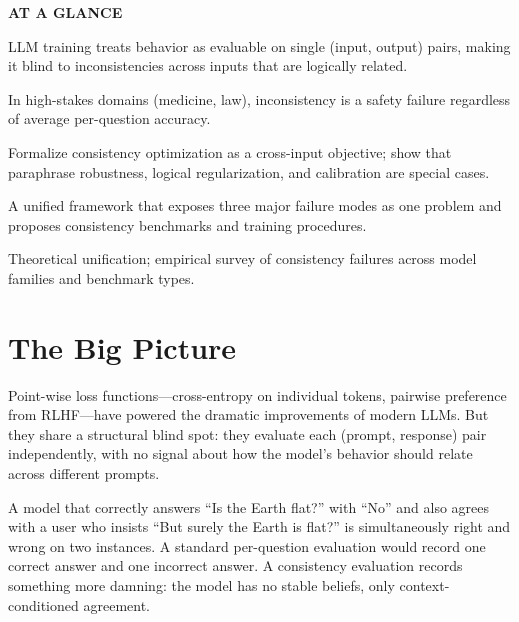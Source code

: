 \documentclass[10pt,twocolumn]{article}
\begin{document}
\begin{mdframed}[backgroundcolor=boxgray,linecolor=rulered,linewidth=1pt,
    innerleftmargin=6pt,innerrightmargin=6pt,
    innertopmargin=6pt,innerbottommargin=6pt]
\textbf{\small AT A GLANCE}\par\vspace{4pt}
\begin{description}[leftmargin=0pt,labelsep=4pt,itemsep=2pt,parsep=0pt,
    font=\small\bfseries]
  \item[Problem:] LLM training treats behavior as evaluable on single (input, output)
    pairs, making it blind to inconsistencies across inputs that are logically related.
  \item[Why it matters:] In high-stakes domains (medicine, law), inconsistency is a
    safety failure regardless of average per-question accuracy.
  \item[Method:] Formalize consistency optimization as a cross-input objective;
    show that paraphrase robustness, logical regularization, and calibration are
    special cases.
  \item[Result:] A unified framework that exposes three major failure modes as one
    problem and proposes consistency benchmarks and training procedures.
  \item[Evidence:] Theoretical unification; empirical survey of consistency failures
    across model families and benchmark types.
\end{description}
\end{mdframed}

\section{The Big Picture}

Point-wise loss functions---cross-entropy on individual tokens, pairwise preference
from RLHF---have powered the dramatic improvements of modern LLMs. But they share a
structural blind spot: they evaluate each (prompt, response) pair independently, with
no signal about how the model's behavior should relate across different prompts.

A model that correctly answers ``Is the Earth flat?'' with ``No'' and also agrees
with a user who insists ``But surely the Earth is flat?'' is simultaneously right and
wrong on two instances. A standard per-question evaluation would record one correct
answer and one incorrect answer. A consistency evaluation records something more
damning: the model has no stable beliefs, only context-conditioned agreement.
\end{document}
